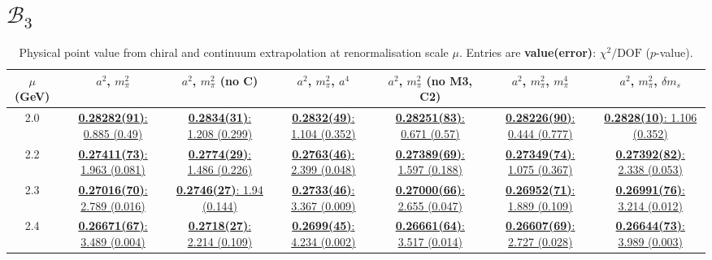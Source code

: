 \documentclass[12pt]{extarticle}
\begin{document}
\section{$\mathcal{B}_3$}
\begin{table}[h!]
\begin{center}
\begin{tabular}{|c|c|c|c|c|c|c|}
\hline
$\mu$ (GeV) & $a^2$, $m_\pi^2$& $a^2$, $m_\pi^2$ (no C)& $a^2$, $m_\pi^2$, $a^4$& $a^2$, $m_\pi^2$ (no M3, C2)& $a^2$, $m_\pi^2$, $m_\pi^4$& $a^2$, $m_\pi^2$, $\delta m_s$\\
\hline
2.0& \hyperlink{SSmPP/SUSY/bag_a2m2_20.pdf.1}{\textbf{0.28282(91)}: 0.885 (0.49)} & \hyperlink{SSmPP/SUSY/bag_a2m2noC_20.pdf.1}{\textbf{0.2834(31)}: 1.208 (0.299)} & \hyperlink{SSmPP/SUSY/bag_a2a4m2_20.pdf.1}{\textbf{0.2832(49)}: 1.104 (0.352)} & \hyperlink{SSmPP/SUSY/bag_a2m2mcut_20.pdf.1}{\textbf{0.28251(83)}: 0.671 (0.57)} & \hyperlink{SSmPP/SUSY/bag_a2m2m4_20.pdf.1}{\textbf{0.28226(90)}: 0.444 (0.777)} & \hyperlink{SSmPP/SUSY/bag_a2m2delm_20.pdf.1}{\textbf{0.2828(10)}: 1.106 (0.352)}\\
2.2& \hyperlink{SSmPP/SUSY/bag_a2m2_22.pdf.1}{\textbf{0.27411(73)}: 1.963 (0.081)} & \hyperlink{SSmPP/SUSY/bag_a2m2noC_22.pdf.1}{\textbf{0.2774(29)}: 1.486 (0.226)} & \hyperlink{SSmPP/SUSY/bag_a2a4m2_22.pdf.1}{\textbf{0.2763(46)}: 2.399 (0.048)} & \hyperlink{SSmPP/SUSY/bag_a2m2mcut_22.pdf.1}{\textbf{0.27389(69)}: 1.597 (0.188)} & \hyperlink{SSmPP/SUSY/bag_a2m2m4_22.pdf.1}{\textbf{0.27349(74)}: 1.075 (0.367)} & \hyperlink{SSmPP/SUSY/bag_a2m2delm_22.pdf.1}{\textbf{0.27392(82)}: 2.338 (0.053)}\\
2.3& \hyperlink{SSmPP/SUSY/bag_a2m2_23.pdf.1}{\textbf{0.27016(70)}: 2.789 (0.016)} & \hyperlink{SSmPP/SUSY/bag_a2m2noC_23.pdf.1}{\textbf{0.2746(27)}: 1.94 (0.144)} & \hyperlink{SSmPP/SUSY/bag_a2a4m2_23.pdf.1}{\textbf{0.2733(46)}: 3.367 (0.009)} & \hyperlink{SSmPP/SUSY/bag_a2m2mcut_23.pdf.1}{\textbf{0.27000(66)}: 2.655 (0.047)} & \hyperlink{SSmPP/SUSY/bag_a2m2m4_23.pdf.1}{\textbf{0.26952(71)}: 1.889 (0.109)} & \hyperlink{SSmPP/SUSY/bag_a2m2delm_23.pdf.1}{\textbf{0.26991(76)}: 3.214 (0.012)}\\
2.4& \hyperlink{SSmPP/SUSY/bag_a2m2_24.pdf.1}{\textbf{0.26671(67)}: 3.489 (0.004)} & \hyperlink{SSmPP/SUSY/bag_a2m2noC_24.pdf.1}{\textbf{0.2718(27)}: 2.214 (0.109)} & \hyperlink{SSmPP/SUSY/bag_a2a4m2_24.pdf.1}{\textbf{0.2699(45)}: 4.234 (0.002)} & \hyperlink{SSmPP/SUSY/bag_a2m2mcut_24.pdf.1}{\textbf{0.26661(64)}: 3.517 (0.014)} & \hyperlink{SSmPP/SUSY/bag_a2m2m4_24.pdf.1}{\textbf{0.26607(69)}: 2.727 (0.028)} & \hyperlink{SSmPP/SUSY/bag_a2m2delm_24.pdf.1}{\textbf{0.26644(73)}: 3.989 (0.003)}\\
\hline
\end{tabular}
\caption{Physical point value from chiral and continuum extrapolation at renormalisation scale $\mu$. Entries are \textbf{value(error)}: $\chi^2/\text{DOF}$ ($p$-value).}
\end{center}
\end{table}
\end{document}
